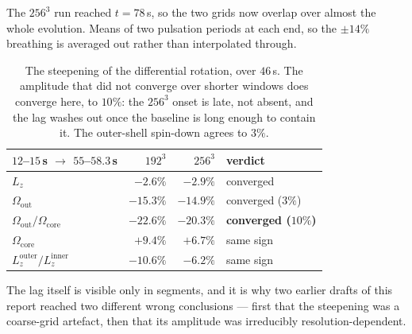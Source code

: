 \documentclass[11pt,a4paper]{article}
\begin{document}
The $256^3$ run reached $t = 78$\,s, so the two grids now overlap over almost
the whole evolution. Means of two pulsation periods at each end, so the
$\pm14\%$ breathing is averaged out rather than interpolated through.

\begin{table}[h]
\centering\small
\begin{tabular}{lrrl}
\toprule
$12$--$15$\,s $\to$ $55$--$58.3$\,s & $192^3$ & $256^3$ & verdict \\
\midrule
$L_z$ & $-2.6\%$ & $-2.9\%$ & converged \\
$\Omega_{\mathrm{out}}$ & $-15.3\%$ & $-14.9\%$ & converged ($3\%$) \\
$\Omega_{\mathrm{out}}/\Omega_{\mathrm{core}}$ & $-22.6\%$ & $-20.3\%$ & \textbf{converged ($10\%$)} \\
$\Omega_{\mathrm{core}}$ & $+9.4\%$ & $+6.7\%$ & same sign \\
$L_z^{\mathrm{outer}}/L_z^{\mathrm{inner}}$ & $-10.6\%$ & $-6.2\%$ & same sign \\
\bottomrule
\end{tabular}
\caption{The steepening of the differential rotation, over $46$\,s. The
amplitude that did not converge over shorter windows does converge here, to
$10\%$: the $256^3$ onset is late, not absent, and the lag washes out once the
baseline is long enough to contain it. The outer-shell spin-down agrees to
$3\%$.}
\label{tab:late}
\end{table}

The lag itself is visible only in segments, and it is why two earlier drafts of
this report reached two different wrong conclusions --- first that the
steepening was a coarse-grid artefact, then that its amplitude was
irreducibly resolution-dependent.
\end{document}
